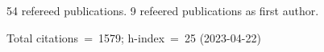 54 refereed publications. 9 refeered publications as first author.

Total citations~=~1579; h-index~=~25 (2023-04-22)